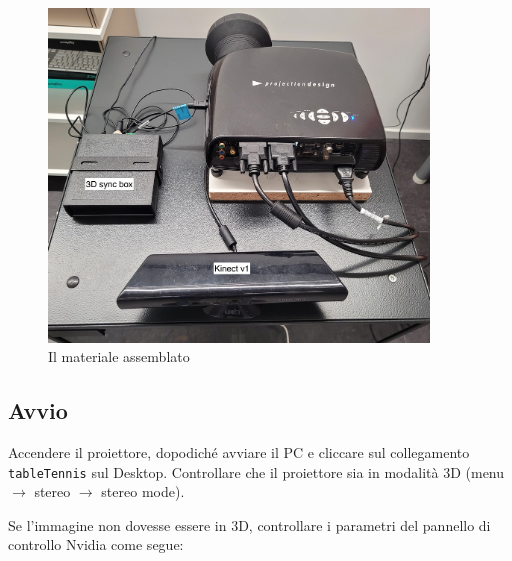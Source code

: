 \documentclass[12pt]{article}
\begin{document}
		\begin{figure}[H]
			\centering
			\includegraphics[width=0.9\textwidth]{img/beamer.jpg}
			\caption*{Il materiale assemblato}
		\end{figure}
		
		
	\newpage
	\subsection{Avvio}

		Accendere il proiettore, dopodiché avviare il PC e cliccare sul collegamento
		\texttt{tableTennis} sul Desktop. Controllare che il proiettore sia in modalità 3D
		(menu $\rightarrow$ stereo $\rightarrow$ stereo mode).

		Se l'immagine non dovesse essere in 3D, controllare i parametri del pannello di controllo Nvidia
		come segue: 
\end{document}
